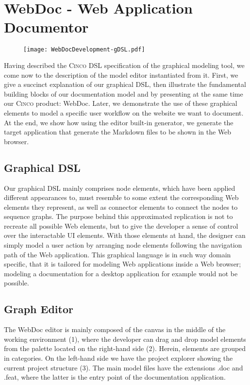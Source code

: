 \chapter{WebDoc - Web Application Documentor}\label{ch:CP}

\begin{figure}[h]
    \centering
    \texttt{[image: WebDocDevelopment-gDSL.pdf]}
    \label{fig:webDoc}
\end{figure}

Having described the \textsc{Cinco} DSL specification of the graphical modeling tool, we come now to the description of the model editor instantiated from it. First, we give a succinct explanation of our graphical DSL, then illustrate the fundamental building blocks of our documentation model and by presenting at the same time our \textsc{Cinco} product: WebDoc. Later, we demonstrate the use of these graphical elements to model a specific user workflow on the website we want to document. At the end, we show how using the editor built-in generator, we generate the target application that generate the Markdown files to be shown in the Web browser.

\section{Graphical DSL}\label{sec:gDSL}

Our graphical DSL mainly comprises node elements, which have been applied different appearances to, must resemble to some extent the corresponding Web elements they represent, as well as connector elements to connect the nodes to sequence graphs. The purpose behind this approximated replication is not to recreate all possible Web elements, but to give the developer a sense of control over the interactable UI elements. With those elements at hand, the designer can simply model a user action by arranging node elements following the navigation path of the Web application. This graphical language is in such way domain specific, that it is tailored for modeling Web applications inside a Web browser; modeling a documentation for a desktop application for example would not be possible.

\section{Graph Editor}\label{sec:graphEditor}

The WebDoc editor is mainly composed of the canvas in the middle of the working environment (1), where the developer can drag and drop model elements from the palette located on the right-hand side (2). Herein, elements are grouped in categories. On the left-hand side we have the project explorer showing the current project structure (3). The main model files have the extensions .doc and .feat, where the latter is the entry point of the documentation application.

